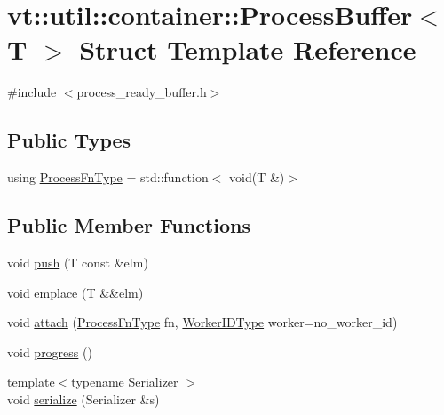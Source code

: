\hypertarget{structvt_1_1util_1_1container_1_1_process_buffer}{}\section{vt\+:\+:util\+:\+:container\+:\+:Process\+Buffer$<$ T $>$ Struct Template Reference}
\label{structvt_1_1util_1_1container_1_1_process_buffer}


{\ttfamily \#include $<$process\+\_\+ready\+\_\+buffer.\+h$>$}

\subsection*{Public Types}
\begin{DoxyCompactItemize}
\item 
using \hyperlink{structvt_1_1util_1_1container_1_1_process_buffer_a20be3480fb453096015a6fe5ca370816}{Process\+Fn\+Type} = std\+::function$<$ void(T \&)$>$
\end{DoxyCompactItemize}
\subsection*{Public Member Functions}
\begin{DoxyCompactItemize}
\item 
void \hyperlink{structvt_1_1util_1_1container_1_1_process_buffer_a1fab9ef25e64fdab844f3e3d40699ad9}{push} (T const \&elm)
\item 
void \hyperlink{structvt_1_1util_1_1container_1_1_process_buffer_ae1bff94f45b85fa126a63b98c6c2e869}{emplace} (T \&\&elm)
\item 
void \hyperlink{structvt_1_1util_1_1container_1_1_process_buffer_ab8b25ce1820da72a1770778252dabfea}{attach} (\hyperlink{structvt_1_1util_1_1container_1_1_process_buffer_a20be3480fb453096015a6fe5ca370816}{Process\+Fn\+Type} fn, \hyperlink{namespacevt_a656e362091da17b9b93d0655b36e3392}{Worker\+I\+D\+Type} worker=no\+\_\+worker\+\_\+id)
\item 
void \hyperlink{structvt_1_1util_1_1container_1_1_process_buffer_aab87efa377b2b94320ba7c83b568b227}{progress} ()
\item 
{\footnotesize template$<$typename Serializer $>$ }\\void \hyperlink{structvt_1_1util_1_1container_1_1_process_buffer_ae67da6866fa8c52960e08b3df1f24327}{serialize} (Serializer \&s)
\end{DoxyCompactItemize}
